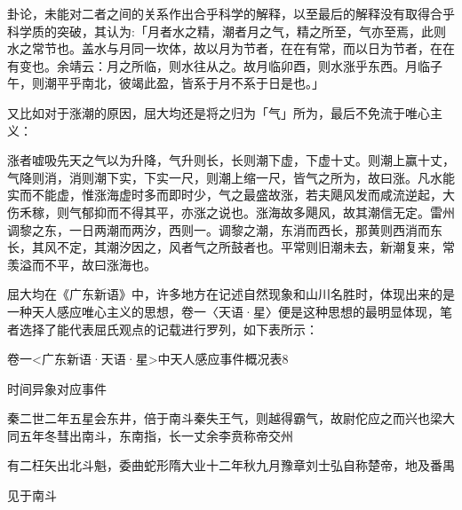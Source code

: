 \vfill
\begin{BookNotes}
\end{BookNotes}

\noindent 卦论，未能对二者之间的关系作出合乎科学的解释，以至最后的解释没有取得合乎科学质的突破，其认为:「月者水之精，潮者月之气，精之所至，气亦至焉，此则水之常节也。盖水与月同一坎体，故以月为节者，在在有常，而以日为节者，在在有变也。余靖云：月之所临，则水往从之。故月临卯酉，则水涨乎东西。月临子午，则潮平乎南北，彼竭此盈，皆系于月不系于日是也。」

又比如对于涨潮的原因，屈大均还是将之归为「气」所为，最后不免流于唯心主义：

\begin{BookQuote}
涨者嘘吸先天之气以为升降，气升则长，长则潮下虚，下虚十丈。则潮上赢十丈，气降则消，消则潮下实，下实一尺，则潮上缩一尺，皆气之所为，故曰涨。凡水能实而不能虚，惟涨海虚时多而即时少，气之最盛故涨，若夫飓风发而咸流逆起，大伤禾稼，则气郁抑而不得其平，亦涨之说也。涨海故多飓风，故其潮信无定。雷州调黎之东，一日两潮而两汐，西则一。调黎之潮，东消而西长，那黄则西消而东长，其风不定，其潮汐因之，风者气之所鼓者也。平常则旧潮未去，新潮复来，常羡溢而不平，故曰涨海也。
\end{BookQuote}


屈大均在《广东新语》中，许多地方在记述自然现象和山川名胜时，体现出来的是一种天人感应唯心主义的思想，卷一〈天语·星〉便是这种思想的最明显体现，笔者选择了能代表屈氏观点的记载进行罗列，如下表所示：

卷一<广东新语·天语·星>中天人感应事件概况表8

\begin{BookQuote}
时间异象对应事件
\end{BookQuote}

秦二世二年五星会东井，倍于南斗秦失王气，则越得霸气，故尉佗应之而兴也梁大同五年冬彗出南斗，东南指，长一丈余李贲称帝交州

有二枉矢出北斗魁，委曲蛇形隋大业十二年秋九月豫章刘士弘自称楚帝，地及番禺

见于南斗

\vfill
\begin{BookNotes}
\end{BookNotes}


